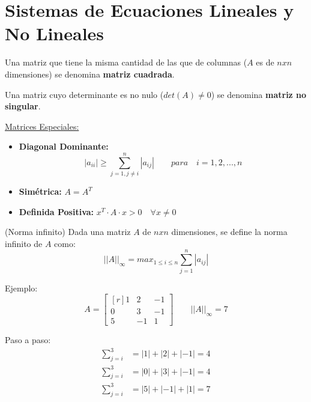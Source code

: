 \documentclass[../main.tex]{subfiles}
\begin{document}
\section{Sistemas de Ecuaciones Lineales y No Lineales} 
    \begin{definition}
        Una matriz que tiene la misma cantidad de las que de columnas ($A$ es de $nxn$ dimensiones) se denomina \textbf{matriz cuadrada}. 
    \end{definition}

    \begin{definition}
        Una matriz cuyo determinante es no nulo ($det(A)\neq 0$) se denomina \textbf{matriz no singular}.
    \end{definition}
        
    \underline{Matrices Especiales:}
    \begin{itemize}
        \item \textbf{Diagonal Dominante:}
            \begin{equation}
                |a_{ii}| \geq \sum_{j=1, j\neq i}^{n} |a_{ij}| \quad \quad para \quad i = 1,2,...,n
            \end{equation}
        \item \textbf{Simétrica:} $A = A^T$
        \item \textbf{Definida Positiva:} $x^T \cdot A \cdot x > 0 \quad \forall x \neq 0$
    \end{itemize}

    \begin{definition}
        (Norma infinito) Dada una matriz $A$ de $nxn$ dimensiones, se define la norma infinito de $A$ como:
        \begin{equation}
            ||A||_{\infty} = max_{1\leq i \leq n} \sum_{j=1}^{n} |a_{ij}|
        \end{equation}

        Ejemplo:
        \begin{equation}
            A = \begin{bmatrix*}[r]
                1 & 2 & -1 \\
                0 & 3 & -1 \\
                5 & -1 & 1
            \end{bmatrix*}
            \quad \quad
            ||A||_{\infty} = 7
        \end{equation}
        
        Paso a paso:
        \begin{equation}
            \begin{split}
                \sum_{j = i}^{3} &= |1| + |2| + |-1| = 4 \\
                \sum_{j = i}^{3} &= |0| + |3| + |-1| = 4 \\
                \sum_{j = i}^{3} &= |5| + |-1| + |1| = 7 \\
            \end{split}
        \end{equation}

    \end{definition}
\end{document}
